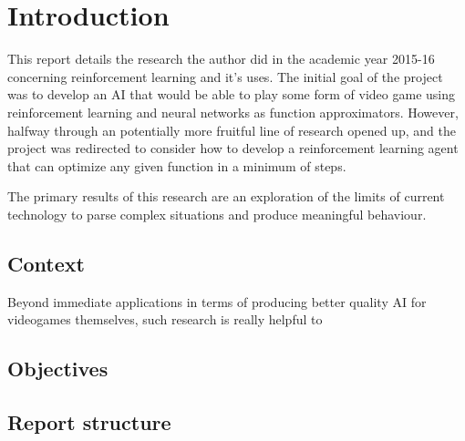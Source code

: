 \section{Introduction}
This report details the research the author did in the academic year 2015-16 concerning reinforcement learning and it's uses. The initial goal of the project was to develop an AI that would be able to play some form of video game using reinforcement learning and neural networks as function approximators. However, halfway through an potentially more fruitful line of research opened up, and the project was redirected to consider how to develop a reinforcement learning agent that can optimize any given function in a minimum of steps.

The primary results of this research are an exploration of the limits of current technology to parse complex situations and produce meaningful behaviour.


\subsection{Context}
Beyond immediate applications in terms of producing better quality AI for videogames themselves, such research is really helpful to 


\subsection{Objectives}

\subsection{Report structure}

